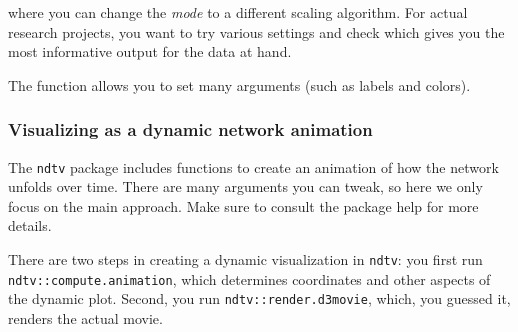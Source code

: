 \documentclass[
]{article}
\begin{document}
where you can change the \emph{mode} to a different scaling algorithm.
For actual research projects, you want to try various settings and check
which gives you the most informative output for the data at hand.

The function allows you to set many arguments (such as labels and
colors).

\hypertarget{visualizing-as-a-dynamic-network-animation}{%
\subsubsection{Visualizing as a dynamic network
animation}\label{visualizing-as-a-dynamic-network-animation}}

The \texttt{ndtv} package includes functions to create an animation of
how the network unfolds over time. There are many arguments you can
tweak, so here we only focus on the main approach. Make sure to consult
the package help for more details.

There are two steps in creating a dynamic visualization in
\texttt{ndtv}: you first run \texttt{ndtv::compute.animation}, which
determines coordinates and other aspects of the dynamic plot. Second,
you run \texttt{ndtv::render.d3movie}, which, you guessed it, renders
the actual movie.
\end{document}
